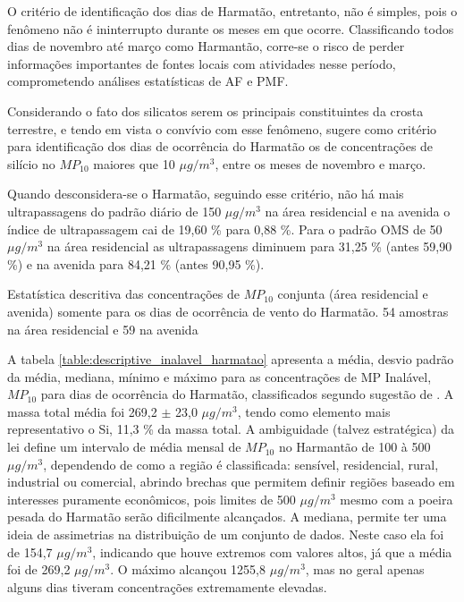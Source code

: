 O critério de identificação dos dias de Harmatão, entretanto, não é simples, 
pois o fenômeno não é ininterrupto durante os meses em que ocorre. 
Classificando todos dias de novembro até março como Harmantão, corre-se o risco 
de perder informações importantes de fontes locais com atividades nesse período, 
comprometendo análises estatísticas de AF e PMF. 

Considerando o fato dos silicatos serem os principais constituintes da crosta
terrestre, e tendo em vista o convívio com esse fenômeno, \citet{aboh2009} 
sugere como critério para identificação dos dias de ocorrência do Harmatão os de
concentrações de silício no $MP_{10}$ maiores que 10 $\mu g/m^3$, entre os meses
de novembro e março. 

Quando desconsidera-se o Harmatão, seguindo esse critério,
não há mais ultrapassagens do padrão diário de 150 $\mu g / m^3$ na área 
residencial e na avenida o índice de ultrapassagem cai de 19,60 \% para 0,88 \%. 
Para o padrão OMS de 50 $\mu g / m^3$ na área residencial as 
ultrapassagens diminuem para 31,25 \% (antes 59,90 \%) e na avenida para 
84,21 \% (antes 90,95 \%).

\begin{table}[H]
  \centering
  
  \caption{Estatística descritiva das concentrações de $MP_{10}$ conjunta
           (área residencial e avenida) somente para os dias de ocorrência 
           de vento do Harmatão. 54 amostras na área residencial e 59 na avenida 
          \label{table:descriptive_inalavel_harmatao}}
\end{table}

A tabela \ref{table:descriptive_inalavel_harmatao} apresenta a média, 
desvio padrão da média, mediana, mínimo e máximo para as concentrações de 
MP Inalável, $MP_{10}$ para dias de ocorrência do Harmatão, classificados
segundo sugestão de \citet{aboh2009}. A massa total média foi 269,2 $\pm$ 23,0
$\mu g/ m^3$, tendo como elemento mais representativo o Si, 11,3 \% da massa total. 
A ambiguidade (talvez estratégica) da lei define um intervalo de média mensal 
de $MP_{10}$ no Harmantão de 100 à 500 $\mu g/ m^3$, dependendo de como a região
é classificada: sensível, residencial, rural, industrial ou comercial, abrindo
brechas que permitem definir regiões baseado em interesses puramente econômicos,
pois limites de 500 $\mu g/ m^3$ mesmo com a poeira pesada do Harmatão serão
dificilmente alcançados. A mediana, permite ter uma ideia de assimetrias na 
distribuição de um conjunto de dados. Neste caso ela foi de 154,7 $\mu g/ m^3$, 
indicando que houve extremos com valores altos, já que a média foi de 
269,2 $\mu g/ m^3$. O máximo alcançou 1255,8 $\mu g/ m^3$, mas no geral apenas 
alguns dias tiveram concentrações extremamente elevadas. %

